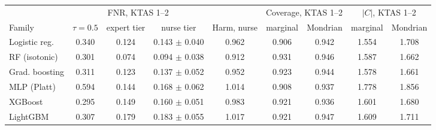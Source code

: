 \begin{tabular}{@{}lcccccccc@{}}
\toprule
 & \multicolumn{3}{c}{FNR, KTAS 1--2} & & \multicolumn{2}{c}{Coverage, KTAS 1--2} & \multicolumn{2}{c}{$|C|$, KTAS 1--2} \\
\cmidrule(lr){2-4}\cmidrule(lr){6-7}\cmidrule(lr){8-9}
Family & $\tau{=}0.5$ & expert tier & nurse tier & Harm, nurse & marginal & Mondrian & marginal & Mondrian \\
\midrule
Logistic reg. & 0.340 & 0.124 & 0.143 $\pm$ 0.040 & 0.962 & 0.906 & 0.942 & 1.554 & 1.708 \\
RF (isotonic) & 0.301 & 0.074 & 0.094 $\pm$ 0.038 & 0.912 & 0.931 & 0.946 & 1.587 & 1.662 \\
Grad. boosting & 0.311 & 0.123 & 0.137 $\pm$ 0.052 & 0.952 & 0.923 & 0.944 & 1.578 & 1.661 \\
MLP (Platt) & 0.594 & 0.144 & 0.168 $\pm$ 0.062 & 1.014 & 0.908 & 0.937 & 1.778 & 1.856 \\
XGBoost & 0.295 & 0.149 & 0.160 $\pm$ 0.051 & 0.983 & 0.921 & 0.936 & 1.601 & 1.680 \\
LightGBM & 0.307 & 0.179 & 0.183 $\pm$ 0.055 & 1.017 & 0.921 & 0.947 & 1.609 & 1.711 \\
\bottomrule
\end{tabular}
